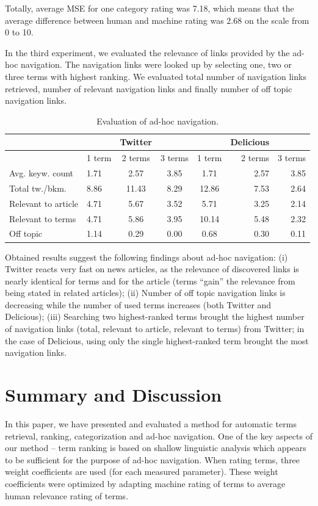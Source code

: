 \documentclass{llncs}%
\begin{document}
Totally, average MSE for one category rating was 7.18, which means that the average difference between human and machine rating was 2.68 on the scale from 0 to 10. 

In the third experiment, we evaluated the relevance of links provided by the ad-hoc navigation. The navigation links were looked up by selecting one, two or three terms with highest ranking. We evaluated total number of navigation links retrieved, number of relevant navigation links and finally number of off topic navigation links. 

\begin{table}[ht]
\centering
\caption{Evaluation of ad-hoc navigation. }
\label{tab2}
\begin{tabular}{|l|lcc|crr|}
\hline
 & & Twitter & & & Delicious & \\
\hline
 & 1 term & 2 terms & 3 terms & 1 term & 2 terms & 3 terms \\
\hline
Avg. keyw. count &	1.71 &	2.57 &	3.85 &	1.71 &	2.57 &	3.85  \\
Total tw./bkm. &	8.86 &	11.43 &	8.29 &	12.86 &	7.53 &	2.64 \\
Relevant to article &	4.71 &	5.67 &	3.52 &	5.71 &	3.25 &	2.14  \\
Relevant to terms &	4.71 &	5.86 &	3.95 &	10.14 &	5.48 & 	2.32  \\
Off topic &	1.14 &	0.29 &	0.00 &	0.68 &	0.30 &	0.11   \\
\hline
\end{tabular}
\end{table}

Obtained results suggest the following findings about ad-hoc navigation: (i) Twitter reacts very fast on news articles, as the relevance of discovered links is nearly identical for terms and for the article (terms “gain” the relevance from being stated in related articles); (ii) Number of off topic navigation links is decreasing while the number of used terms increases (both Twitter and Delicious); (iii) Searching two highest-ranked terms brought the highest number of navigation links (total, relevant to article, relevant to terms) from Twitter; in the case of Delicious, using only the single highest-ranked term brought the most navigation links. 

\section{Summary and Discussion}
In this paper, we have presented and evaluated a method for automatic terms retrieval, ranking, categorization and ad-hoc navigation. One of the key aspects of our method – term ranking is based on shallow linguistic analysis which appears to be sufficient for the purpose of ad-hoc navigation. When rating terms, three weight coefficients are used (for each measured parameter). These weight coefficients were optimized by adapting machine rating of terms to average human relevance rating of terms.  
\end{document}
